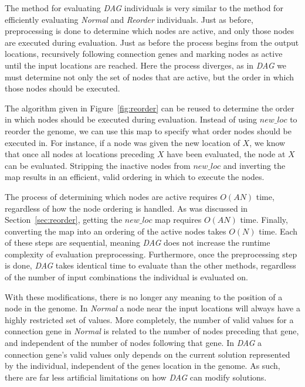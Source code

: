 \documentclass[journal]{IEEEtran}
\begin{document}
The method for evaluating \emph{DAG} individuals is very similar to the method for
efficiently evaluating \emph{Normal} and \emph{Reorder} individuals.  Just as before,
preprocessing is done to determine which nodes are active, and only those nodes are
executed during evaluation.  Just as before the process begins from the output locations,
recursively following connection genes and marking nodes as active until the input locations
are reached.  Here the process diverges, as in \emph{DAG} we must determine not only the set of
nodes that are active, but the order in which those nodes should be executed.

The algorithm given in Figure~\ref{fig:reorder} can be reused to determine the order
in which nodes should be executed during evaluation.  Instead of using $new\_loc$
to reorder the genome, we can use this map to specify what order nodes should be
executed in.  For instance, if a node was given the new location of $X$, we know
that once all nodes at locations preceding $X$ have been evaluated, the node at $X$
can be evaluated.  Stripping the inactive nodes from $new\_loc$ and inverting the map
results in an efficient, valid ordering in which to execute the nodes.

The process of determining which nodes are active requires $O(AN)$ time, regardless
of how the node ordering is handled.  As was discussed in Section~\ref{sec:reorder},
getting the $new\_loc$ map requires $O(AN)$ time.  Finally, converting the map
into an ordering of the active nodes takes $O(N)$ time.  Each of these steps are
sequential, meaning \emph{DAG} does not increase the runtime complexity of evaluation
preprocessing.  Furthermore, once the preprocessing step is done, \emph{DAG} takes
identical time to evaluate than the other methods, regardless of the number of
input combinations the individual is evaluated on.

With these modifications, there is no longer any meaning to the position of a node
in the genome.  In \emph{Normal} a node near the input locations will always
have a highly restricted set of values.  More completely, the number of valid
values for a connection gene in \emph{Normal} is related to the number of nodes
preceding that gene, and independent of the number of nodes following that gene.
In \emph{DAG} a connection gene's valid values only depends on the current solution
represented by the individual, independent of the genes location in the genome.
As such, there are far less artificial limitations on how \emph{DAG} can modify
solutions.
\end{document}
